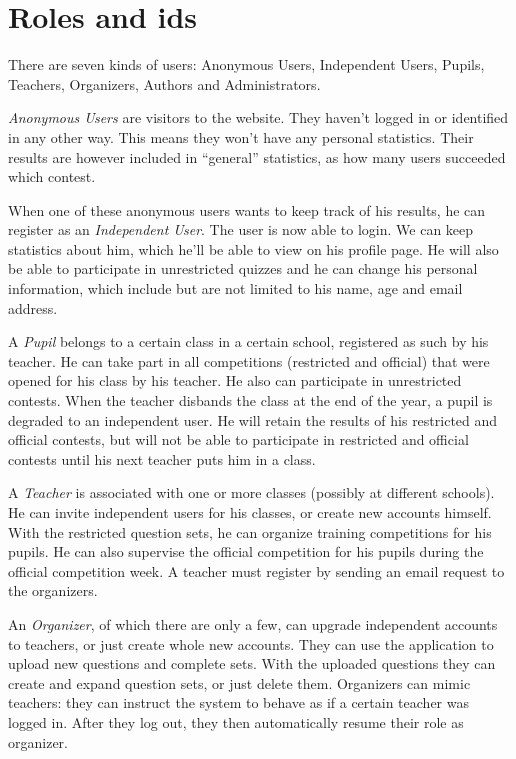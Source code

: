 \section{Roles and ids}

There are seven kinds of users: Anonymous Users, Independent Users, Pupils,
Teachers, Organizers, Authors and Administrators.

\textit{Anonymous Users} are visitors to the website. They haven't logged in or
identified in any other way. This means they won't have any personal
statistics. Their results are however included in ``general'' statistics, as
how many users succeeded which contest.

When one of these anonymous users wants to keep track of his results, he can
register as an \textit{Independent User}. The user is now able to login. We can
keep statistics about him, which he'll be able to view on his profile page.  
He will also be able to participate in unrestricted quizzes and he
can change his personal information, which include but are not limited to his
name, age and email address.

A \textit{Pupil} belongs to a certain class in a certain school, registered
as such by his teacher. He can take part in all competitions (restricted and
official) that were opened for his class by his teacher. He also can
participate in unrestricted contests. When the teacher disbands the class at
the end of the year, a pupil is degraded to an independent user. He will
retain the results of his restricted and official contests, but will not be
able to participate in restricted and official contests until his next teacher puts him in a class.

A \textit{Teacher} is associated with one or more classes (possibly at
different schools). He can invite independent users for his classes, or create
new accounts himself. With the restricted question sets, he can organize
training competitions for his pupils. He can also supervise the official
competition for his pupils during the official competition week. A teacher
must register by sending an email request to the organizers.

An \textit{Organizer}, of which there are only a few, can upgrade independent
accounts to teachers, or just create whole new accounts. They can use the
application to upload new questions and complete sets. With the uploaded
questions they can create and expand question sets, or just delete them.
Organizers can mimic teachers: they can instruct the system to behave as if a
certain teacher was logged in. After they log out, they then automatically
resume their role as organizer.


